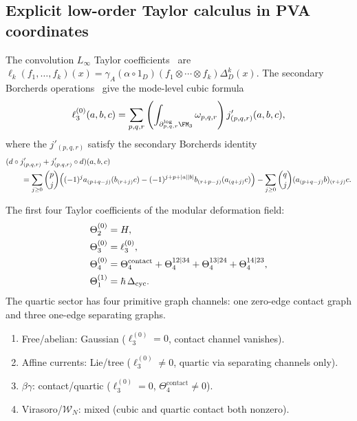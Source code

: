 \subsection{Explicit low-order Taylor calculus in PVA coordinates}
\label{subsec:vol2-explicit-low-order-taylor-calculus}

The convolution $L_\infty$ Taylor coefficients~\cite[Theorem~5.1]{RNW19}
are
$\ell_k(f_1,\dots,f_k)(x)
=
\gamma_A(\alpha\circ 1_D)(f_1\otimes\cdots\otimes f_k)\Delta_D^k(x)$.
The secondary Borcherds operations~\cite{MS24} give the mode-level
cubic formula
\begin{equation}
\label{eq:vol2-explicit-l3-secondary-borcherds}
\ell_3^{(0)}(a,b,c)
=
\sum_{p,q,r}
\left(
\int_{\partial^{\log}_{p,q,r}\FM_3} \omega_{p,q,r}
\right)
 j'_{(p,q,r)}(a,b,c),
\end{equation}
where the $j'_{(p,q,r)}$ satisfy the secondary Borcherds identity
\begin{align}
\label{eq:vol2-secondary-borcherds-identity}
&(d\circ j'_{(p,q,r)}+j'_{(p,q,r)}\circ d)(a,b,c)
\notag\\
&\qquad=
\sum_{j\ge 0}\binom{p}{j}
\Bigl(
(-1)^j a_{(p+q-j)}(b_{(r+j)}c)
-(-1)^{j+p+|a||b|}b_{(r+p-j)}(a_{(q+j)}c)
\Bigr)
-\sum_{j\ge 0}\binom{q}{j}(a_{(p+q-j)}b)_{(r+j)}c.
\end{align}

\begin{proposition}
\label{prop:vol2-quartic-channels-and-loop-term}
The first four Taylor coefficients of the modular deformation field:
\begin{align}
\label{eq:vol2-low-order-atlas}
\Theta_{2}^{(0)} &= H,
\notag\\
\Theta_{3}^{(0)} &= \ell_3^{(0)},
\notag\\
\Theta_{4}^{(0)} &= \Theta_{4}^{\mathrm{contact}} + \Theta_{4}^{12\mid 34} + \Theta_{4}^{13\mid 24} + \Theta_{4}^{14\mid 23},
\notag\\
\Theta_{1}^{(1)} &= \hbar\,\Delta_{\mathrm{cyc}}.
\end{align}
The quartic sector has four primitive graph channels: one zero-edge
contact graph and three one-edge separating graphs.
\end{proposition}

\begin{remark}
\label{rem:vol2-family-by-family-low-order-atlas}
\begin{enumerate}[label=\textup{(\roman*)}]
\item Free/abelian: Gaussian ($\ell_3^{(0)}=0$, contact channel vanishes).
\item Affine currents: Lie/tree ($\ell_3^{(0)}\neq 0$, quartic via separating channels only).
\item $\beta\gamma$: contact/quartic ($\ell_3^{(0)}=0$, $\Theta_4^{\mathrm{contact}}\neq 0$).
\item Virasoro/$\mathcal W_N$: mixed (cubic and quartic contact both nonzero).
\end{enumerate}
\end{remark}

